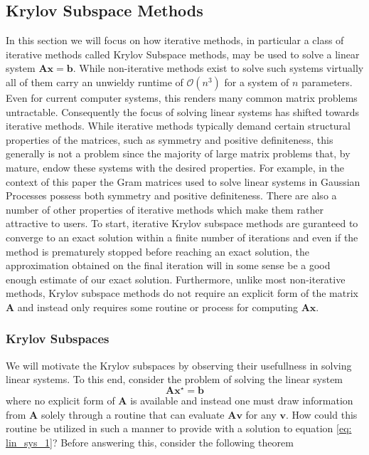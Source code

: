 \subsection{Krylov Subspace Methods}\label{Section1.1}

In this section we will focus on how iterative methods, in particular a class of iterative methods called Krylov Subspace methods, may be used to solve a linear system $\bm{A} \bm{x} = \bm{b}$. While non-iterative methods exist to solve such systems virtually all of them carry an unwieldy runtime of $\mathcal{O} \left( n^3 \right)$ for a system of $n$ parameters. Even for current computer systems, this renders many common matrix problems untractable. Consequently the focus of solving linear systems has shifted towards iterative methods. While iterative methods typically demand certain structural properties of the matrices, such as symmetry and positive definiteness, this generally is not a problem since the majority of large matrix problems that, by mature, endow these systems with the desired properties. For example, in the context of this paper the Gram matrices used to solve linear systems in Gaussian Processes possess both symmetry and positive definiteness. There are also a number of other properties of iterative methods which make them rather attractive to users. To start, iterative Krylov subspace methods are guranteed to converge to an exact solution within a finite number of iterations and even if the method is prematurely stopped before reaching an exact solution, the approximation obtained on the final iteration will in some sense be a good enough estimate of our exact solution. Furthermore, unlike most non-iterative methods, Krylov subspace methods do not require an explicit form of the matrix $\bm{A}$ and instead only requires some routine or process for computing $\bm{A} \bm{x}$.

\subsubsection{Krylov Subspaces}\label{Section1.1.1}

We will motivate the Krylov subspaces by observing their usefullness in solving linear systems. To this end, consider the problem of solving the linear system
\begin{equation}\label{eq: lin_sys_1}
    \bm{A} \bm{x^{\star}} = \bm{b}
\end{equation}
where no explicit form of $\bm{A}$ is available and instead one must draw information from $\bm{A}$ solely through a routine that can evaluate $\bm{A} \bm{v}$ for any $\bm{v}$. How could this routine be utilized in such a manner to provide with a solution to equation \ref{eq: lin_sys_1}? Before answering this, consider the following theorem

